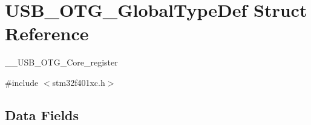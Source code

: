 \hypertarget{struct_u_s_b___o_t_g___global_type_def}{}\section{U\+S\+B\+\_\+\+O\+T\+G\+\_\+\+Global\+Type\+Def Struct Reference}
\label{struct_u_s_b___o_t_g___global_type_def}


\+\_\+\+\_\+\+U\+S\+B\+\_\+\+O\+T\+G\+\_\+\+Core\+\_\+register  




{\ttfamily \#include $<$stm32f401xc.\+h$>$}

\subsection*{Data Fields}
